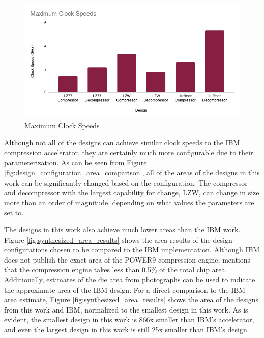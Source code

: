 \documentclass[doublespace,nopageskip]{VTthesis}
\begin{document}
\begin{figure}[htb]
	\centering
	\includegraphics[scale=0.6]{Maximum Clock Speeds.png}
	\caption{Maximum Clock Speeds}
	\label{fig:maximum_clock_speeds}
\end{figure}

Although not all of the designs can achieve similar clock speeds to the IBM compression accelerator, they are certainly much more configurable due to their parameterization. As can be seen from Figure \ref{fig:design_configuration_area_comparison}, all of the areas of the designs in this work can be significantly changed based on the configuration. The compressor and decompressor with the largest capability for change, LZW, can change in size more than an order of magnitude, depending on what values the parameters are set to.

The designs in this work also achieve much lower areas than the IBM work. Figure \ref{fig:synthesized_area_results} shows the area results of the design configurations chosen to be compared to the IBM implementation. Although IBM does not publish the exact area of the POWER9 compression engine, \cite{ibm} mentions that the compression engine takes less than 0.5\% of the total chip area. Additionally, estimates of the die area from photographs can be used to indicate the approximate area of the IBM design\cite{wikichip-ibm-area}. For a direct comparison to the IBM area estimate, Figure \ref{fig:synthesized_area_results} shows the area of the designs from this work and IBM, normalized to the smallest design in this work. As is evident, the smallest design in this work is 866x smaller than IBM's accelerator, and even the largest design in this work is still 25x smaller than IBM's design. 
\end{document}
